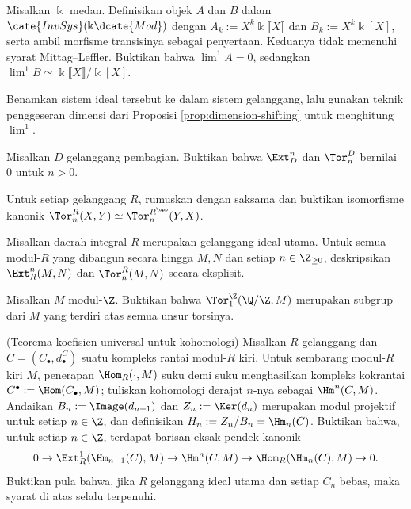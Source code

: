 \begin{Exercises}
	\item Misalkan $\Bbbk$ medan. Definisikan objek $A$ dan $B$ dalam
	$\cate{InvSys}(\Bbbk\dcate{Mod})$ dengan
	$A_k:=X^k\Bbbk\llbracket X\rrbracket$ dan
	$B_k:=X^k\Bbbk[X]$, serta ambil morfisme transisinya sebagai penyertaan.
	Keduanya tidak memenuhi syarat Mittag--Leffler. Buktikan bahwa
	$\lim\nolimits^1A=0$, sedangkan
	$\lim\nolimits^1B\simeq
	\Bbbk\llbracket X\rrbracket/\Bbbk[X]$.
	\begin{hint}
		Benamkan sistem ideal tersebut ke dalam sistem gelanggang, lalu gunakan
		teknik penggeseran dimensi dari Proposisi
		\ref{prop:dimension-shifting} untuk menghitung $\lim\nolimits^1$.
	\end{hint}

	\item Misalkan $D$ gelanggang pembagian. Buktikan bahwa
	$\Ext_D^n$ dan $\Tor_n^D$ bernilai $0$ untuk $n>0$.

	\item Untuk setiap gelanggang $R$, rumuskan dengan saksama dan buktikan
	isomorfisme kanonik
	$\Tor_n^R(X,Y)\simeq\Tor_n^{R^{\opp}}(Y,X)$.

	\item Misalkan daerah integral $R$ merupakan gelanggang ideal utama.
	Untuk semua modul-$R$ yang dibangun secara hingga $M,N$ dan setiap
	$n\in\Z_{\geq0}$, deskripsikan $\Ext_R^n(M,N)$ dan $\Tor_n^R(M,N)$ secara
	eksplisit.

	\item Misalkan $M$ modul-$\Z$. Buktikan bahwa
	$\Tor_1^\Z(\Q/\Z,M)$ merupakan subgrup dari $M$ yang terdiri atas semua
	unsur torsinya.

	\item (Teorema koefisien universal untuk kohomologi) Misalkan $R$
	gelanggang dan $C=(C_\bullet,d^C_\bullet)$ suatu kompleks rantai
	modul-$R$ kiri. Untuk sembarang modul-$R$ kiri $M$, penerapan
	$\Hom_R(\cdot,M)$ suku demi suku menghasilkan kompleks kokrantai
	$C^\bullet:=\Hom(C_\bullet,M)$; tuliskan kohomologi derajat $n$-nya sebagai
	$\Hm^n(C,M)$. Andaikan
	$B_n:=\Image(d_{n+1})$ dan $Z_n:=\Ker(d_n)$ merupakan modul projektif
	untuk setiap $n\in\Z$, dan definisikan
	$H_n:=Z_n/B_n=\Hm_n(C)$. Buktikan bahwa, untuk setiap $n\in\Z$, terdapat
	barisan eksak pendek kanonik
	\[
		0\to\Ext_R^1(\Hm_{n-1}(C),M)
		\to\Hm^n(C,M)
		\to\Hom_R(\Hm_n(C),M)\to0.
	\]
	Buktikan pula bahwa, jika $R$ gelanggang ideal utama dan setiap $C_n$
	bebas, maka syarat di atas selalu terpenuhi.


\end{Exercises}
